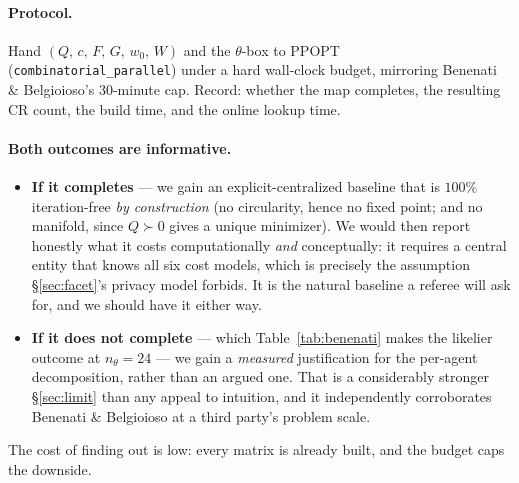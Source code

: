 \documentclass[11pt, letterpaper]{article}
\begin{document}
\paragraph{Protocol.} Hand $(Q,\,c,\,F,\,G,\,w_0,\,W)$ and the $\theta$-box to PPOPT
(\texttt{combinatorial\_parallel}) under a hard wall-clock budget, mirroring Benenati \&
Belgioioso's 30-minute cap. Record: whether the map completes, the resulting CR count, the build
time, and the online lookup time.

\paragraph{Both outcomes are informative.}
\begin{itemize}[leftmargin=1.4em,nosep]
\item \textbf{If it completes} --- we gain an explicit-centralized baseline that is $100\%$
iteration-free \emph{by construction} (no circularity, hence no fixed point; and no manifold, since
$Q\succ0$ gives a unique minimizer). We would then report honestly what it costs computationally
\emph{and} conceptually: it requires a central entity that knows all six cost models, which is
precisely the assumption \S\ref{sec:facet}'s privacy model forbids. It is the natural baseline a
referee will ask for, and we should have it either way.
\item \textbf{If it does not complete} --- which Table~\ref{tab:benenati} makes the likelier outcome
at $n_\theta=24$ --- we gain a \emph{measured} justification for the per-agent decomposition, rather
than an argued one. That is a considerably stronger \S\ref{sec:limit} than any appeal to intuition,
and it independently corroborates Benenati \& Belgioioso at a third party's problem scale.
\end{itemize}
The cost of finding out is low: every matrix is already built, and the budget caps the downside.
\end{document}
